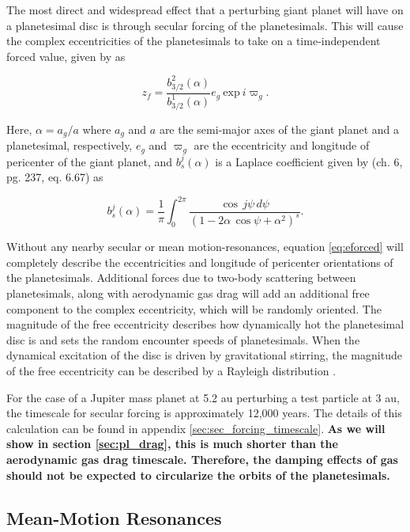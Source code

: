 The most direct and widespread effect that a perturbing giant planet will have on a planetesimal disc is through secular forcing of 
the planetesimals. This will cause the complex eccentricities of the planetesimals to take on a time-independent forced value, 
given by \cite{wyatt99} as

\begin{equation}\label{eq:eforced}
	z_{f} = \frac{b^{2}_{3/2} (\alpha)}{b^{1}_{3/2} (\alpha)} e_{g} ~ \mathrm{exp} ~ i \varpi_{g}.
\end{equation}

\noindent Here, $\alpha = a_{g} / a$ where $a_{g}$ and $a$ are the semi-major axes of the giant planet and a planetesimal, 
respectively, $e_{g}$ and $\varpi_{g}$ are the eccentricity and longitude of pericenter of the giant planet, and $b^{j}_{s} (\alpha)$ 
is a Laplace coefficient given by \cite{murray99} (ch. 6, pg. 237, eq. 6.67) as

\begin{equation}\label{eq:lap}
	b_{s}^{j}(\alpha) = \frac{1}{\pi} \int_{0}^{2 \pi} \frac{\cos \, j \psi \, d \psi}{\left( 1 - 2 \alpha \, \cos \psi + \alpha^2 \right)^{s}}.
\end{equation}

Without any nearby secular or mean motion-resonances, equation \ref{eq:eforced} will completely describe the eccentricities and 
longitude of  pericenter orientations of the planetesimals. Additional forces due to two-body scattering between planetesimals, 
along with aerodynamic gas drag will add an additional free component to the complex eccentricity, which will be randomly 
oriented. The magnitude of the free eccentricity describes how dynamically hot the planetesimal disc is and sets the random 
encounter speeds of planetesimals. When the dynamical excitation of the disc is driven by gravitational stirring, the magnitude of 
the free eccentricity can be described by a Rayleigh distribution \cite{ida92}.

For the case of a Jupiter mass planet at 5.2 au perturbing a test particle at 3 au, the timescale for secular forcing is 
approximately 12,000 years. The details of this calculation can be found in appendix \ref{sec:sec_forcing_timescale}. \textbf{As we will show in section \ref{sec:pl_drag}, this is much shorter than the aerodynamic gas drag timescale. Therefore, the damping effects of gas should not be expected to circularize the orbits of the planetesimals.}

\subsection{Mean-Motion Resonances}\label{sec:mmr}

